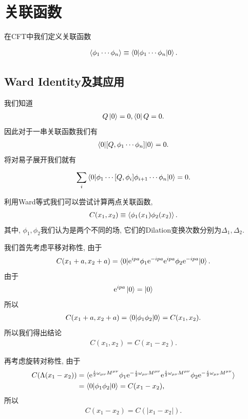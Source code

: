 \section{关联函数}
在CFT中我们定义关联函数
\begin{definition}[关联函数]
    \begin{align}
        \braket{\phi_1\cdots \phi_n}\equiv \braket{0|\phi_1\cdots\phi_n|0}.
    \end{align}
\end{definition}

\subsection{Ward Identity及其应用}
我们知道
\begin{align}
    Q\ket0=0, \bra0Q=0.
\end{align}
因此对于一串关联函数我们有
\begin{align}
    \braket{0|[Q, \phi_1\cdots\phi_n]|0}=0.
\end{align}
将对易子展开我们就有
\begin{theorem}
    \begin{align}
        \sum_i \braket{0|\phi_1\cdots[Q, \phi_i]\phi_{i+1}\cdots\phi_n|0}=0.
    \end{align}
\end{theorem}

利用Ward等式我们可以尝试计算两点关联函数,
\begin{align}
    C(x_1, x_2)\equiv\braket{\phi_1(x_1)\phi_2(x_2)}.
\end{align}
其中, $\phi_1, \phi_2$我们认为是两个不同的场, 它们的Dilation变换次数分别为$\Delta_1,\Delta_2$.

我们首先考虑平移对称性, 由于
\begin{align}
    C(x_1+a, x_2+a)=\braket{0|\mathrm e^{ipa}\phi_1\mathrm e^{-ipa}\mathrm e^{ipa}\phi_2\mathrm e^{-ipa}|0}.
\end{align}
由于
\begin{align}
    \mathrm e^{ipa}\ket 0=\ket0
\end{align}
所以
\begin{align}
    C(x_1+a, x_2+a)=\braket{0|\phi_1\phi_2|0}=C(x_1,x_2).
\end{align}
所以我们得出结论
\begin{align}
    C(x_1, x_2)=C(x_1-x_2).
\end{align}

再考虑旋转对称性, 由于
\begin{align}
    C(\Lambda(x_1-x_2))&=\braket{\mathrm e^{\frac i2\omega_{\mu\nu}M^{\mu\nu}}\phi_1\mathrm e^{-\frac i2\omega_{\mu\nu}M^{\mu\nu}}\mathrm e^{\frac i2\omega_{\mu\nu}M^{\mu\nu}}\phi_2\mathrm e^{-\frac i2\omega_{\mu\nu}M^{\mu\nu}}}\\
    &=\braket{0|\phi_1\phi_2|0}=C(x_1-x_2),
\end{align}
所以
\begin{align}
    C(x_1-x_2)=C(|x_1-x_2|).
\end{align}

